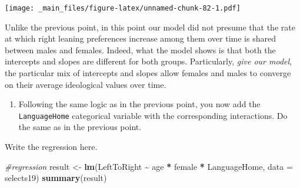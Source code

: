 \documentclass[
]{book}
\newenvironment{Shaded}{\begin{snugshade}}{\end{snugshade}}
\newcommand{\AttributeTok}[1]{\textcolor[rgb]{0.13,0.29,0.53}{#1}}
\newcommand{\CommentTok}[1]{\textcolor[rgb]{0.56,0.35,0.01}{\textit{#1}}}
\newcommand{\FunctionTok}[1]{\textcolor[rgb]{0.13,0.29,0.53}{\textbf{#1}}}
\newcommand{\NormalTok}[1]{#1}
\newcommand{\OtherTok}[1]{\textcolor[rgb]{0.56,0.35,0.01}{#1}}
\newcommand{\SpecialCharTok}[1]{\textcolor[rgb]{0.81,0.36,0.00}{\textbf{#1}}}
\providecommand{\tightlist}{%
  \setlength{\itemsep}{0pt}\setlength{\parskip}{0pt}}
\begin{document}
\texttt{[image: \_main\_files/figure-latex/unnamed-chunk-82-1.pdf]}

Unlike the previous point, in this point our model did not presume that the rate at which right leaning preferences increase among them over time is shared between males and females. Indeed, what the model shows is that both the intercepts and slopes are different for both groups. Particularly, \emph{give our model}, the particular mix of intercepts and slopes allow females and males to converge on their average ideological values over time.

\begin{enumerate}
\def\labelenumi{\arabic{enumi}.}
\setcounter{enumi}{5}
\tightlist
\item
  Following the same logic as in the previous point, you now add the \texttt{LanguageHome} categorical variable with the corresponding interactions. Do the same as in the previous point.
\end{enumerate}

Write the regression here.

\begin{Shaded}
\begin{Highlighting}[]
\CommentTok{\#regression}
\NormalTok{result }\OtherTok{\textless{}{-}} \FunctionTok{lm}\NormalTok{(LeftToRight }\SpecialCharTok{\textasciitilde{}}\NormalTok{ age }\SpecialCharTok{*}\NormalTok{ female }\SpecialCharTok{*}\NormalTok{ LanguageHome, }\AttributeTok{data =}\NormalTok{ selects19)}
\FunctionTok{summary}\NormalTok{(result)}
\end{Highlighting}
\end{Shaded}
\end{document}
